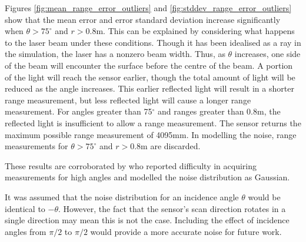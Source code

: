 		Figures \ref{fig:mean_range_error_outliers} and \ref{fig:stddev_range_error_outliers} show that the mean error and error standard deviation increase significantly when $\theta > 75^\circ$ and $r > 0.8$m. This can be explained by considering what happens to the laser beam under these conditions. Though it has been idealised as a ray in the simulation, the laser has a nonzero beam width. Thus, as $\theta$ increases, one side of the beam will encounter the surface before the centre of the beam. A portion of the light will reach the sensor earlier, though the total amount of light will be reduced as the angle increases. This earlier reflected light will result in a shorter range measurement, but less reflected light will cause a longer range measurement. For angles greater than 75$^\circ$ and ranges greater than 0.8m, the reflected light is insufficient to allow a range measurement. The sensor returns the maximum possible range measurement of 4095mm. In modelling the noise, range measurements for $\theta > 75^\circ$ and $r > 0.8$m are discarded.
		
		These results are corroborated by \cite{park2010characterization} who reported difficulty in acquiring measurements for high angles and modelled the noise distribution as Gaussian.
		
		It was assumed that the noise distribution for an incidence angle $\theta$ would be identical to $-\theta$. However, the fact that the sensor's scan direction rotates in a single direction may mean this is not the case. Including the effect of incidence angles from $\pi/2$ to $\pi/2$ would provide a more accurate noise for future work.
		
